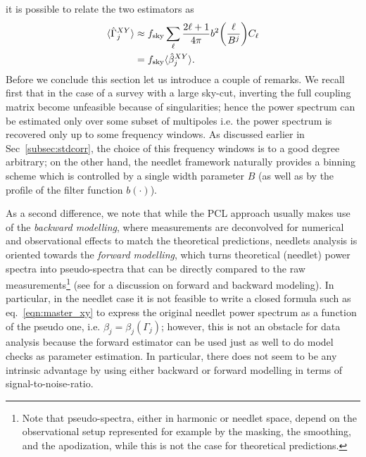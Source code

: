 \documentclass[a4paper,11pt]{article}
\begin{document}
it is possible to relate the two estimators as 
%
\begin{equation}
\label{eqn:gammabeta}
\begin{split}
\langle \hat{\Gamma}^{XY}_j \rangle &\approx  f_{\rm sky}\sum_{\ell} \frac{2\ell+1}{{4\pi}} b^2\biggl(\frac{\ell}{B^{j}}\biggr) C_{\ell}\\
&= f_{\rm sky} \langle \hat{\beta}^{XY}_j \rangle.
\end{split}
\end{equation}
%
Before we conclude this section let us introduce a couple of remarks. We recall first that in the case of a survey with a large sky-cut, inverting the full coupling matrix become unfeasible because of singularities; hence the power spectrum can be estimated only over some subset of multipoles i.e. the power spectrum is recovered only up to some frequency windows.
As discussed earlier in Sec~\ref{subsec:stdcorr}, the choice of this frequency windows is to a good degree arbitrary; on the other hand, the needlet framework naturally provides a binning 
scheme which is  controlled by a single width parameter $B$ (as well as by the profile of the filter function $b(\cdot)$).

As a second difference, we note that while the  PCL approach  usually
makes use of the \emph{backward modelling}, where measurements are deconvolved for numerical and observational 
effects to match the theoretical predictions, needlets analysis is oriented towards the 
\emph{forward modelling}, which turns theoretical (needlet) power spectra into pseudo-spectra that can be directly compared to the raw 
measurements\footnote{Note that pseudo-spectra, either in harmonic or needlet space, depend on the observational setup represented
for example by the masking, the smoothing, and the apodization, while this is not the case for theoretical predictions.} (see \cite{Harnois-Deraps2016} 
for a  discussion on forward and backward modeling). 
In particular, in the needlet case it is not feasible to write a closed formula such as eq.~\ref{eqn:master_xy} to express the original needlet power spectrum as a function of the pseudo one, i.e. $\beta_j = \beta_j(\Gamma_j)$; however, this is not an obstacle for data analysis because the forward estimator can be used just as well to do model checks as parameter estimation. In particular, there does not seem to be any intrinsic advantage by using either backward or forward modelling in terms of signal-to-noise-ratio.
\end{document}
